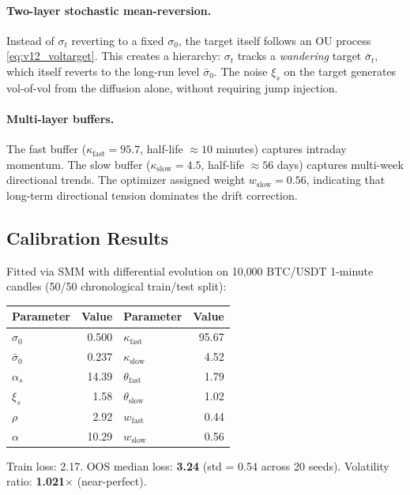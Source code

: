 \documentclass[11pt,a4paper]{article}
\begin{document}
\paragraph{Two-layer stochastic mean-reversion.}
Instead of $\sigma_t$ reverting to a fixed $\sigma_0$, the target itself
follows an OU process \eqref{eq:v12_voltarget}. This creates a hierarchy:
$\sigma_t$ tracks a \emph{wandering} target $\bar{\sigma}_t$, which itself
reverts to the long-run level $\bar{\sigma}_0$. The noise $\xi_s$ on the
target generates vol-of-vol from the diffusion alone, without requiring
jump injection.

\paragraph{Multi-layer buffers.}
The fast buffer ($\kappa_{\text{fast}} = 95.7$, half-life $\approx 10$
minutes) captures intraday momentum. The slow buffer
($\kappa_{\text{slow}} = 4.5$, half-life $\approx 56$ days) captures
multi-week directional trends. The optimizer assigned weight
$w_{\text{slow}} = 0.56$, indicating that long-term directional tension
dominates the drift correction.

\subsection{Calibration Results}

Fitted via SMM with differential evolution on 10{,}000 BTC/USDT 1-minute
candles (50/50 chronological train/test split):

\begin{center}
\begin{tabular}{lr@{\quad}lr}
\toprule
\textbf{Parameter} & \textbf{Value} & \textbf{Parameter} & \textbf{Value} \\
\midrule
$\sigma_0$ & 0.500 & $\kappa_{\text{fast}}$ & 95.67 \\
$\bar{\sigma}_0$ & 0.237 & $\kappa_{\text{slow}}$ & 4.52 \\
$\alpha_s$ & 14.39 & $\theta_{\text{fast}}$ & 1.79 \\
$\xi_s$ & 1.58 & $\theta_{\text{slow}}$ & 1.02 \\
$\rho$ & 2.92 & $w_{\text{fast}}$ & 0.44 \\
$\alpha$ & 10.29 & $w_{\text{slow}}$ & 0.56 \\
\bottomrule
\end{tabular}
\end{center}

Train loss: 2.17. OOS median loss: \textbf{3.24} (std = 0.54 across 20 seeds).
Volatility ratio: \textbf{1.021$\times$} (near-perfect).
\end{document}
